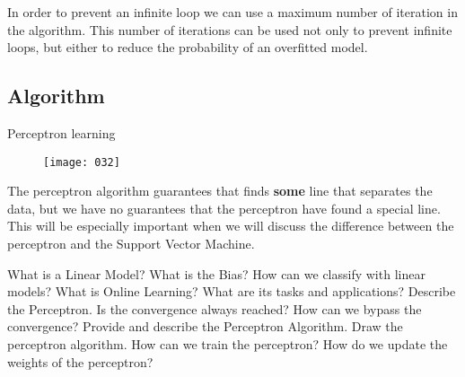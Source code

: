 In order to prevent an infinite loop we can use a maximum number of iteration in the algorithm. This number of iterations can be used not only to prevent infinite loops, but either to reduce the probability of an overfitted model.

\subsection{Algorithm}
\begin{algorithm}[h!]
\caption{Perceptron learning}
\label{alg:perceptron}
\end{algorithm}

\begin{figure}[t]
\begin{center}
    \texttt{[image: 032]}
    \label{fig:032}
\end{center}
\end{figure}

The perceptron algorithm guarantees that finds \textbf{some} line that separates the data, but we have no guarantees that the perceptron have found a special line. This will be especially important when we will discuss the difference between the perceptron and the Support Vector Machine.

\newpage
\begin{exercise}[topsep=20pt,itemsep=10pt]
    \ex What is a Linear Model?
    \ex What is the Bias?
    \ex How can we classify with linear models?
    \ex What is Online Learning? What are its tasks and applications?
    \ex Describe the Perceptron. Is the convergence always reached? How can we bypass the convergence?
    \ex[!] Provide and describe the Perceptron Algorithm.
    \ex[!] Draw the perceptron algorithm. How can we train the perceptron?
    \ex[!] How do we update the weights of the perceptron?
\end{exercise}